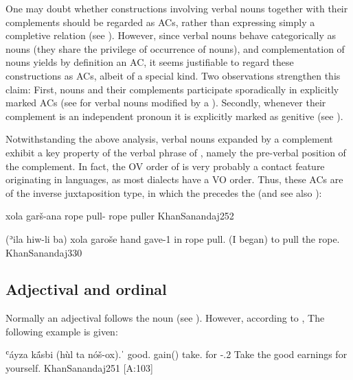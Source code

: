 One may doubt whether constructions involving verbal nouns together with their complements should be regarded as ACs, rather than expressing simply a completive  relation (see ). However, since verbal nouns behave categorically as nouns  (they share the privilege of occurrence of nouns), and complementation of  nouns yields by definition an AC, it seems justifiable to regard these constructions as ACs, albeit of a special kind. Two observations strengthen this claim: First, nouns and their complements participate sporadically in explicitly marked ACs (see  for verbal nouns modified by a ). Secondly, whenever their complement is an independent pronoun it is explicitly marked as genitive (see ).

Notwithstanding the above analysis, verbal nouns expanded by a complement exhibit a key property of the verbal phrase of \JSan, namely the pre-verbal position of the complement. In fact, the OV order of \JSan is very probably a contact feature originating in  languages, as most  dialects have a VO order. Thus, these ACs are of the {inverse juxtaposition} type, in which the \secn precedes the \prim (and see also ):

{xola garš-ana}
{rope pull-\prtc}
{rope puller}
{KhanSanandaj}{252}

{(ʾila hiw-li ba\cb{}) xola garoše}
{hand gave-1\sg{} in\cb{} rope pull.\inf}
{(I began) to pull the rope.}
{KhanSanandaj}{330}




\subsection{Adjectival and ordinal \secns} \label{ss:JSan_juxt_inverse_adj}

Normally an adjectival \secn follows the \prim noun (see ). However, according to \citet[251]{KhanSanandaj},  The following example is given:

{ʿáyza kā́sbi (hùl ta\cb{} nóš-ox).ˈ}
{good.\masc\footnotemark{} gain(\fem) take.\imp{} for\cb{} -\poss.2\masc}
{Take the good earnings for yourself.}
{KhanSanandaj}{251 {[A:103]}}
\vspace*{-2mm}

